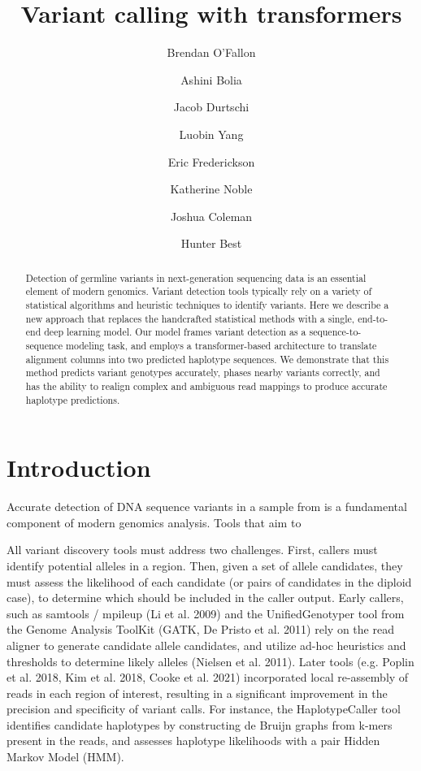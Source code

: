 \documentclass[]{article}
\title{Variant calling with transformers}
\author[1]{Brendan O'Fallon}
\author[1]{Ashini Bolia}
\author[1]{Jacob Durtschi}
\author[1]{Luobin Yang}
\author[1]{Eric Frederickson}
\author[1]{Katherine Noble}
\author[1]{Joshua Coleman}
\author[1]{Hunter Best}
\affil[1]{ARUP Institute for Clinical and Experimental Pathology, Salt Lake City, UT}
\date{}
\begin{document}
\maketitle

\begin{abstract}
	Detection of germline variants in next-generation sequencing data is an essential element of modern genomics. Variant detection tools typically rely on a variety of statistical algorithms and heuristic techniques to identify variants. Here we describe a new approach that replaces the handcrafted statistical methods with a single, end-to-end deep learning model. Our model frames variant detection as a sequence-to-sequence modeling task, and employs a transformer-based architecture to translate alignment columns into two predicted haplotype sequences. We demonstrate that this method predicts variant genotypes accurately, phases nearby variants correctly, and has the ability to realign complex and ambiguous read mappings to produce accurate haplotype predictions. 

\end{abstract}



\section{Introduction}

Accurate detection of DNA sequence variants in a sample from is a fundamental component of modern genomics analysis. Tools that aim to 

All variant discovery tools must address two challenges. First, callers must identify potential alleles in a region. Then, given a set of allele candidates, they must assess the likelihood of each candidate (or pairs of candidates in the diploid case), to determine which should be included in the caller output. Early callers, such as samtools / mpileup (Li et al. 2009) and the UnifiedGenotyper tool from the Genome Analysis ToolKit (GATK, De Pristo et al. 2011) rely on the read aligner to generate candidate allele candidates, and utilize ad-hoc heuristics and thresholds to determine likely alleles (Nielsen et al. 2011). Later tools (e.g. Poplin et al. 2018, Kim et al. 2018, Cooke et al. 2021) incorporated local re-assembly of reads in each region of interest, resulting in a significant improvement in the precision and specificity of variant calls. For instance, the HaplotypeCaller tool identifies candidate haplotypes by constructing de Bruijn graphs from k-mers present in the reads, and assesses haplotype likelihoods with a pair Hidden Markov Model (HMM). 
\end{document}
